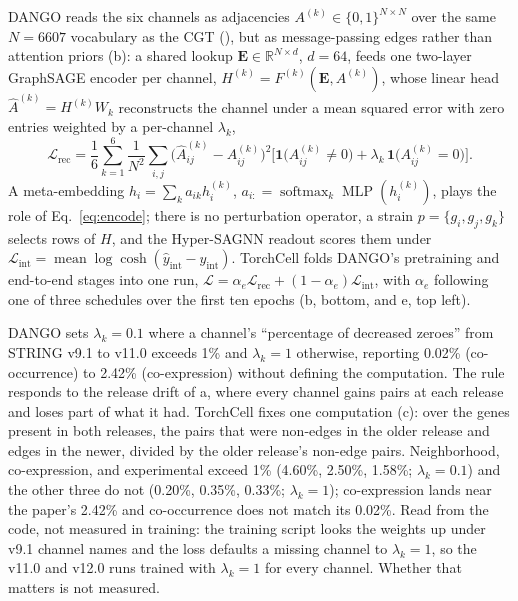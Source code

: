  DANGO reads the six channels as adjacencies
$A^{(k)}\in\{0,1\}^{N\times N}$ over the same $N=6607$ vocabulary as the CGT
(), but as message-passing edges rather than attention priors
(b): a shared lookup $\mathbf{E}\in\mathbb{R}^{N\times d}$, $d=64$,
feeds one two-layer GraphSAGE encoder per channel, $H^{(k)}=F^{(k)}(\mathbf{E},A^{(k)})$,
whose linear head $\hat A^{(k)}=H^{(k)}W_k$ reconstructs the channel under a mean squared
error with zero entries weighted by a per-channel $\lambda_k$,
\begin{equation}
\mathcal{L}_{\mathrm{rec}}=\frac{1}{6}\sum_{k=1}^{6}\frac{1}{N^{2}}\sum_{i,j}
\big(\hat A^{(k)}_{ij}-A^{(k)}_{ij}\big)^{2}\Big[\mathbf{1}\big(A^{(k)}_{ij}\neq0\big)+\lambda_k\,\mathbf{1}\big(A^{(k)}_{ij}=0\big)\Big].
\label{eq:dango-rec}
\end{equation}
A meta-embedding $h_i=\sum_k a_{ik}h_i^{(k)}$, $a_{i:}=\operatorname{softmax}_k\operatorname{MLP}(h_i^{(k)})$,
plays the role of Eq.~\ref{eq:encode}; there is no perturbation operator, a strain
$p=\{g_i,g_j,g_k\}$ selects rows of $H$, and the Hyper-SAGNN readout scores them under
$\mathcal{L}_{\mathrm{int}}=\operatorname{mean}\log\cosh(\hat y_{\mathrm{int}}-y_{\mathrm{int}})$.
TorchCell folds DANGO's pretraining and end-to-end stages into one run,
$\mathcal{L}=\alpha_e\mathcal{L}_{\mathrm{rec}}+(1-\alpha_e)\mathcal{L}_{\mathrm{int}}$, with
$\alpha_e$ following one of three schedules over the first ten epochs
(b, bottom, and e, top left).

 DANGO sets $\lambda_k=0.1$ where a channel's
``percentage of decreased zeroes'' from STRING v9.1 to v11.0 exceeds 1\% and $\lambda_k=1$
otherwise, reporting 0.02\% (co-occurrence) to 2.42\% (co-expression) without defining the
computation. The rule responds to the release drift of a, where every
channel gains pairs at each release and loses part of what it had. TorchCell fixes one
computation (c): over the genes present in both
releases, the pairs that were non-edges in the older release and edges in the newer, divided
by the older release's non-edge pairs. Neighborhood, co-expression, and experimental exceed
1\% (4.60\%, 2.50\%, 1.58\%; $\lambda_k=0.1$) and the other three do not (0.20\%, 0.35\%,
0.33\%; $\lambda_k=1$); co-expression lands near the paper's 2.42\% and co-occurrence does
not match its 0.02\%. Read from the code, not measured in training: the training script
looks the weights up under v9.1 channel names and the loss defaults a missing channel to
$\lambda_k=1$, so the v11.0 and v12.0 runs trained with $\lambda_k=1$ for every channel.
Whether that matters is not measured.

